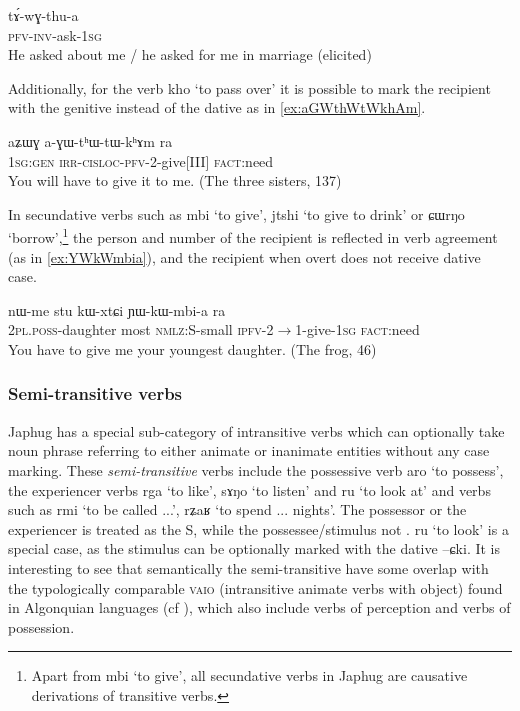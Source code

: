 \documentclass[oldfontcommands,oneside,a4paper,11pt]{article}
\newcommand{\ipa}[1]{{\phon #1}} %
\begin{document}
 \begin{exe}
   \ex   \label{ex:tAGwthua}
 \gll
\ipa{tɤ́-wɣ-thu-a} \\
\textsc{pfv-inv}-ask-\textsc{1sg}\\
\glt He asked about me / he asked for me in marriage (elicited)   
      \end{exe}  
      
   Additionally, for the verb \ipa{kho} `to pass over' it is possible to mark the recipient with the genitive instead of the dative as in \ref{ex:aGWthWtWkhAm}.
 \begin{exe}
   \ex   \label{ex:aGWthWtWkhAm}
 \gll
\ipa{aʑɯɣ}  	\ipa{a-ɣɯ-tʰɯ-tɯ-kʰɤm}  	\ipa{ra}  \\
\textsc{1sg:gen} \textsc{irr-cisloc-pfv}-2-give[III] \textsc{fact}:need \\
\glt You will have to give it to me. (The three sisters, 137)
   \end{exe}  


In secundative verbs such as \ipa{mbi} `to give', \ipa{jtshi} `to give to drink' or \ipa{ɕɯrŋo} `borrow',\footnote{Apart from \ipa{mbi} `to give', all secundative verbs in Japhug are causative derivations of transitive verbs.} the person and number of the recipient is reflected in verb agreement (as in \ref{ex:YWkWmbia}), and the recipient when overt does not receive dative case.


 \begin{exe}
   \ex   \label{ex:YWkWmbia}
 \gll 
\ipa{nɯ-me}  	\ipa{stu}  	\ipa{kɯ-xtɕi}  	\ipa{ɲɯ-kɯ-mbi-a}  	\ipa{ra}  \\
\textsc{2pl.poss}-daughter most \textsc{nmlz}:S-small \textsc{ipfv}-2$\rightarrow$1-give-\textsc{1sg} \textsc{fact}:need \\
\glt You have to give me your youngest daughter.  (The frog, 46)
   \end{exe}  

   
   
\subsubsection{Semi-transitive verbs} \label{sec:semi.tr}
  Japhug has a special sub-category of intransitive verbs which can optionally take  noun phrase referring to either animate or inanimate entities without any case marking.   These  \textit{semi-transitive} verbs   include the possessive verb \ipa{aro} `to possess', the experiencer verbs \ipa{rga} `to like', \ipa{sɤŋo} `to listen' and \ipa{ru} `to look at' and verbs such as \ipa{rmi} `to be called ...', \ipa{rʑaʁ} `to spend ... nights'. The possessor or the experiencer is treated as the S, while the possessee/stimulus not . \ipa{ru} `to look' is a special case, as the stimulus can be optionally marked with the dative \ipa{--ɕki}. It is interesting to see that semantically the semi-transitive have some overlap with the typologically  comparable \textsc{vaio} (intransitive animate verbs with object) found in Algonquian languages (cf  \citealt[242]{valentine01grammar}), which also include verbs of perception and verbs of possession.
\end{document}
